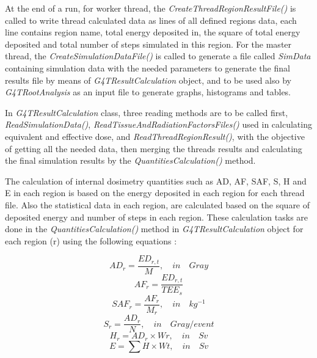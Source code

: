 \documentclass[letterpaper,12pt]{article}
\begin{document}
At the end of a run, for worker thread, the \textit{CreateThreadRegionResultFile()} is called to write thread calculated data as lines of all defined regions data, each line contains region name, total energy deposited in, the square of total energy deposited and total number of steps simulated in this region.
For the master thread, the \textit{CreateSimulationDataFile()} is called to generate a file called \textit{SimData} containing simulation data with the needed parameters to generate the final results file by means of \textit{G4TResultCalculation} object, and to be used also by \textit{G4TRootAnalysis} as an input file to generate graphs, histograms and tables.

In \textit{G4TResultCalculation} class, three reading methods are to be called first, \textit{ReadSimulationData()}, \textit{ReadTissueAndRadiationFactorsFiles()} used in calculating equivalent and effective dose, and \textit{ReadThreadRegionResult()}, with the objective of getting all the needed data, then merging the threads results and calculating the final simulation results by the \textit{QuantitiesCalculation()} method.

The calculation of internal dosimetry quantities such as AD, AF, SAF, S, H and E in each region is based on the energy deposited in each region for each thread file. Also the statistical data in each region, are calculated based on the square of deposited energy and number of steps in each region. These calculation tasks are done in the \textit{QuantitiesCalculation()} method in \textit{G4TResultCalculation} object for each region (r) using the following equations :

\begin{equation}
    \label{eq:AD}
    AD_r = \frac{ED_{r,t}}{M} , \quad in \quad Gray 
\end{equation} 
\begin{equation}
    \label{eq:AF}
    AF_r = \frac{ED_{r,t}}{TEE_s} 
\end{equation} 
\begin{equation}
    \label{eq:SAF}
    SAF_r = \frac{AF_r}{M_r}  , \quad in \quad kg^{-1} 
\end{equation} 
\begin{equation}
    \label{eq:S}
    S_r = \frac{AD_r}{N}  , \quad in \quad Gray/event 
\end{equation} 
\begin{equation}
    \label{eq:H}
    H_r = AD_r\times Wr  , \quad in \quad Sv 
\end{equation} 
\begin{equation}
    \label{eq:E}
    E = \sum H\times Wt  , \quad in \quad Sv
\end{equation} 
\end{document}
